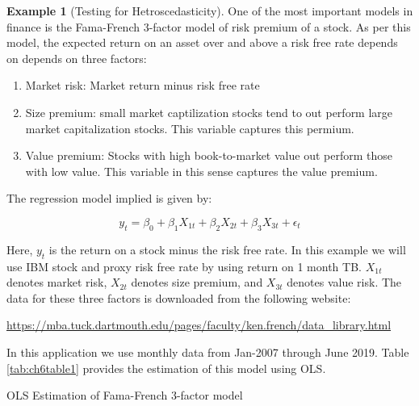 \documentclass[
]{book}
\theoremstyle{definition}
\theoremstyle{definition}
\newtheorem{example}{Example}[chapter]
\theoremstyle{definition}
\theoremstyle{definition}
\theoremstyle{remark}
\begin{document}
\begin{example}[Testing for Hetroscedasticity]
\protect\hypertarget{exm:unnamed-chunk-37}{}\label{exm:unnamed-chunk-37}One of the most important models in finance is the Fama-French 3-factor model of risk premium of a stock. As per this model, the expected return on an asset over and above a risk free rate depends on depends on three factors:

\begin{enumerate}
\def\labelenumi{\alph{enumi}.}
\item
  Market risk: Market return minus risk free rate
\item
  Size premium: small market captilization stocks tend to out perform large market capitalization stocks. This variable captures this permium.
\item
  Value premium: Stocks with high book-to-market value out perform those with low value. This variable in this sense captures the value premium.
\end{enumerate}

The regression model implied is given by:

\[y_t= \beta_0 + \beta_1 X_{1t} + \beta_2X_{2t} + \beta_3 X_{3t} + \epsilon_t\]

Here, \(y_t\) is the return on a stock minus the risk free rate. In this example we will use IBM stock and proxy risk free rate by using return on 1 month TB. \(X_{1t}\) denotes market risk, \(X_{2t}\) denotes size premium, and \(X_{3t}\) denotes value risk. The data for these three factors is downloaded from the following website:

\url{https://mba.tuck.dartmouth.edu/pages/faculty/ken.french/data_library.html}

In this application we use monthly data from Jan-2007 through June 2019. Table \ref{tab:ch6table1} provides the estimation of this model using OLS.
\end{example}

\label{tab:ch6table1} OLS Estimation of Fama-French 3-factor model
\end{document}
